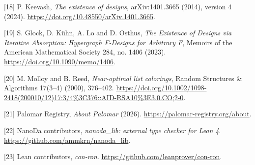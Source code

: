 \documentclass[spanish,11pt,a4paper]{article}
\begin{document}
{[}18{]} P. Keevash, \emph{The existence of designs}, arXiv:1401.3665 (2014), version 4 (2024). \url{https://doi.org/10.48550/arXiv.1401.3665}.

{[}19{]} S. Glock, D. Kühn, A. Lo and D. Osthus, \emph{The Existence of Designs via Iterative Absorption: Hypergraph F-Designs for Arbitrary F}, Memoirs of the American Mathematical Society 284, no. 1406 (2023). \url{https://doi.org/10.1090/memo/1406}.

{[}20{]} M. Molloy and B. Reed, \emph{Near-optimal list colorings}, Random Structures \& Algorithms 17(3--4) (2000), 376--402. \url{https://doi.org/10.1002/1098-2418(200010/12)17:3/4\%3C376::AID-RSA10\%3E3.0.CO;2-0}.

{[}21{]} Palomar Registry, \emph{About Palomar} (2026). \url{https://palomar-registry.org/about}.

{[}22{]} NanoDa contributors, \emph{nanoda\_lib: external type checker for Lean 4}. \url{https://github.com/ammkrn/nanoda_lib}.

{[}23{]} Lean contributors, \emph{con-ron}. \url{https://github.com/leanprover/con-ron}.

\endgroup
\end{document}
